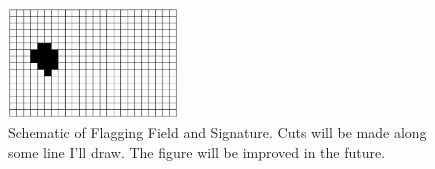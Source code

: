 \begin{figure}
\begin{center}
\includegraphics[width=0.4\textwidth]{figures/SignatureSchematic.eps}
\end{center}
\caption{
Schematic of Flagging Field and Signature.  Cuts will be made along
some line I'll draw.  The figure will be improved in the future.
}
\label{fig.signature}
\end{figure}





